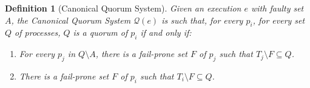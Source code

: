 \documentclass[11pt,letterpaper]{article}
\newtheorem{definition}{Definition}
\begin{document}
\begin{definition}[Canonical Quorum System]
  Given an execution $e$ with faulty set $A$, the Canonical Quorum System $\mathcal{Q}(e)$ is such that, for every $p_i$, for every set $Q$ of processes, $Q$ is a quorum of $p_i$ if and only if:
\begin{enumerate}
  \item For every $p_j$ in $Q\setminus A$, there is a fail-prone set $F$ of $p_j$ such that $T_j\setminus F \subseteq Q$.
  \item There is a fail-prone set $F$ of $p_i$ such that $T_i\setminus F \subseteq Q$.
\end{enumerate}
\end{definition}
\end{document}
